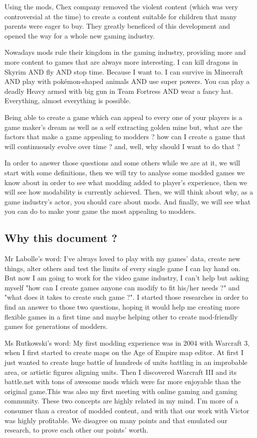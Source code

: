 \documentclass[a4paper,12pt]{article}
\begin{document}
Using the mods, Chex company removed the violent content (which was very controversial at the time) to create a content suitable for children that many parents were eager to buy. They greatly beneficed of this development and opened the way for a whole new gaming industry.

Nowadays mods rule their kingdom in the gaming industry, providing more and more content to games that are always more interesting. I can kill dragons in Skyrim AND fly AND stop time. Because I want to. I can survive in Minecraft AND play with pokémon-shaped animals AND use super powers. You can play a deadly Heavy armed with big gun in Team Fortress AND wear a fancy hat. Everything, almost everything is possible.


Being able to create a game which can appeal to every one of your players is a game maker's dream as well as a self extracting golden mine but, what are the factors that make a game appealing to modders ? how can I create a game that will continuously evolve over time ? and, well, why should I want to do that ?

In order to answer those questions and some others while we are at it, we will start with some definitions, then we will try to analyse some modded games we know about in order to see what modding added to player's experience, then we will see how modability is currently achieved. Then, we will think about why, as a game industry's actor, you should care about mods. And finally, we will see what you can do to make your game the most appealing to modders.


\subsection{Why this document ?}

Mr Labolle's word:
I've always loved to play with my games' data, create new things, alter others and test the limits of every single game I can lay hand on. But now I am going to work for the video game industry, I can't help but asking myself "how can I create games anyone can modify to fit his/her needs ?" and "what does it takes to create such game ?". I started those researches in order to find an answer to those two questions, hoping it would help me creating more flexible games in a first time and maybe helping other to create mod-friendly games for generations of modders.

Ms Rutkowski's word:
My first modding experience was in 2004 with Warcraft 3, when I first started to create maps on the Age of Empire map editor. At first I just wanted to create huge battle of hundreds of units battling in an improbable area, or artistic figures aligning units. Then I discovered Warcraft III and its battle.net with tons of awesome mods which were far more enjoyable than the original game.This was also my first meeting with online gaming and gaming community. These two concepts are highly related in my mind. I'm more of a consumer than a creator of modded content, and with that our work with Victor was highly profitable. We disagree on many points and that emulated our research, to prove each other our points' worth.
\end{document}
